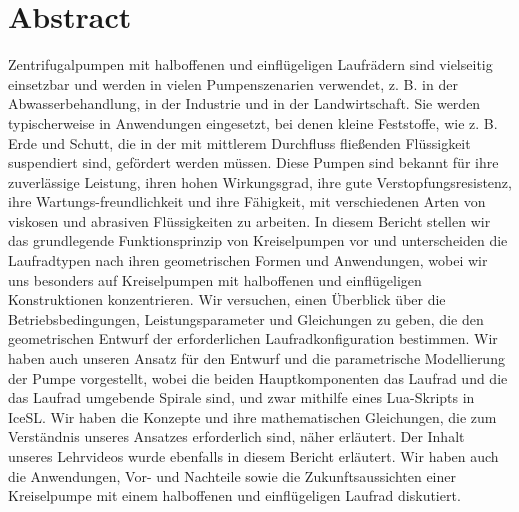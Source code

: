 \documentclass[11pt,a4paper]{scrartcl}
\begin{document}
\listoffigures
\thispagestyle{empty}
\cleardoublepage
{} 
\newpage
%
%
\section{Abstract}
Zentrifugalpumpen mit halboffenen und einflügeligen Laufrädern sind vielseitig einsetzbar und werden in vielen Pumpenszenarien verwendet, z. B. in der Abwasserbehandlung, in der Industrie und in der Landwirtschaft. Sie werden typischerweise in Anwendungen eingesetzt, bei denen kleine Feststoffe, wie z. B. Erde und Schutt, die in der mit mittlerem Durchfluss fließenden Flüssigkeit suspendiert sind, gefördert werden müssen. Diese Pumpen sind bekannt für ihre zuverlässige Leistung, ihren hohen Wirkungsgrad, ihre gute Verstopfungsresistenz, ihre Wartungs-freundlichkeit und ihre Fähigkeit, mit verschiedenen Arten von viskosen und abrasiven Flüssigkeiten zu arbeiten. In diesem Bericht stellen wir das grundlegende Funktionsprinzip von Kreiselpumpen vor und unterscheiden die Laufradtypen nach ihren geometrischen Formen und Anwendungen, wobei wir uns besonders auf Kreiselpumpen mit halboffenen und einflügeligen Konstruktionen konzentrieren. Wir versuchen, einen Überblick über die Betriebsbedingungen, Leistungsparameter und Gleichungen zu geben, die den geometrischen Entwurf der erforderlichen Laufradkonfiguration bestimmen. Wir haben auch unseren Ansatz für den Entwurf und die parametrische Modellierung der Pumpe vorgestellt, wobei die beiden Hauptkomponenten das Laufrad und die das Laufrad umgebende Spirale sind, und zwar mithilfe eines Lua-Skripts in IceSL. Wir haben die Konzepte und ihre mathematischen Gleichungen, die zum Verständnis unseres Ansatzes erforderlich sind, näher erläutert. Der Inhalt unseres Lehrvideos wurde ebenfalls in diesem Bericht erläutert. Wir haben auch die Anwendungen, Vor- und Nachteile sowie die Zukunftsaussichten einer Kreiselpumpe mit einem halboffenen und einflügeligen Laufrad diskutiert.\\
\end{document}
